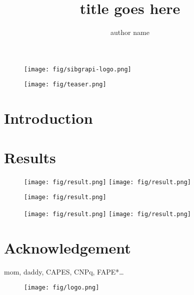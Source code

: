 \documentclass{sciposter}
\title{title goes here}
\author{author name}
\institute{institute --- university}
\begin{document}

\begin{figure}
	\vspace{-5cm}
	\hspace{-5cm}
	\texttt{[image: fig/sibgrapi-logo.png]}
\end{figure}

\maketitle

\begin{figure}
	\texttt{[image: fig/teaser.png]}
\end{figure}

\begin{multicols}{3}


\begin{abstract}
	\lipsum[1]
\end{abstract}


\section{Introduction}
\lipsum[1]

\section{Results}
\lipsum[1]
%
\begin{figure}
	\texttt{[image: fig/result.png]}
	\texttt{[image: fig/result.png]}
\end{figure}
%
\lipsum[1]
%
\begin{figure}
	\texttt{[image: fig/result.png]}
\end{figure}
%
\lipsum[1]
%
\begin{figure}
	\texttt{[image: fig/result.png]}
	\texttt{[image: fig/result.png]}
\end{figure}
%
\lipsum[1]


\section{Acknowledgement}
mom, daddy, CAPES, CNPq, FAPE*\ldots

\begin{figure}
	\texttt{[image: fig/logo.png]}
\end{figure}


\end{multicols}
\end{document}
